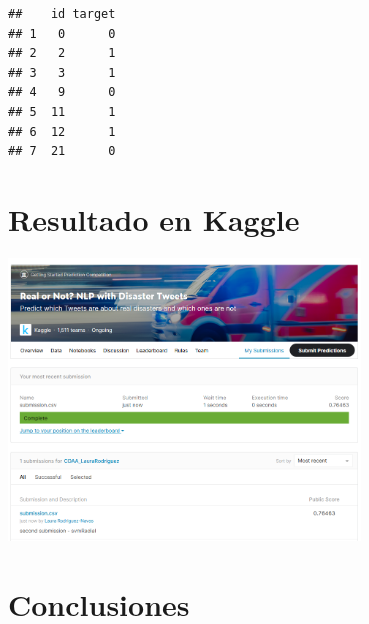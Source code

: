 \documentclass[]{article}
\newenvironment{Shaded}{\begin{snugshade}}{\end{snugshade}}
\newcommand{\DataTypeTok}[1]{\textcolor[rgb]{0.13,0.29,0.53}{#1}}
\newcommand{\DecValTok}[1]{\textcolor[rgb]{0.00,0.00,0.81}{#1}}
\newcommand{\KeywordTok}[1]{\textcolor[rgb]{0.13,0.29,0.53}{\textbf{#1}}}
\newcommand{\NormalTok}[1]{#1}
\newcommand{\OperatorTok}[1]{\textcolor[rgb]{0.81,0.36,0.00}{\textbf{#1}}}
\newcommand{\OtherTok}[1]{\textcolor[rgb]{0.56,0.35,0.01}{#1}}
\newcommand{\StringTok}[1]{\textcolor[rgb]{0.31,0.60,0.02}{#1}}
\begin{document}
\vspace{2mm}


\begin{Shaded}
\end{Shaded}

\begin{verbatim}
##    id target
## 1   0      0
## 2   2      1
## 3   3      1
## 4   9      0
## 5  11      1
## 6  12      1
## 7  21      0
\end{verbatim}

\hypertarget{resultado-en-kaggle}{%
\section{Resultado en Kaggle}\label{resultado-en-kaggle}}

\begin{center}
	\includegraphics[width=0.7\textwidth,height=\textheight]{submission.png}
\end{center}

\hypertarget{conclusiones}{%
\section{Conclusiones}\label{conclusiones}}
\end{document}
